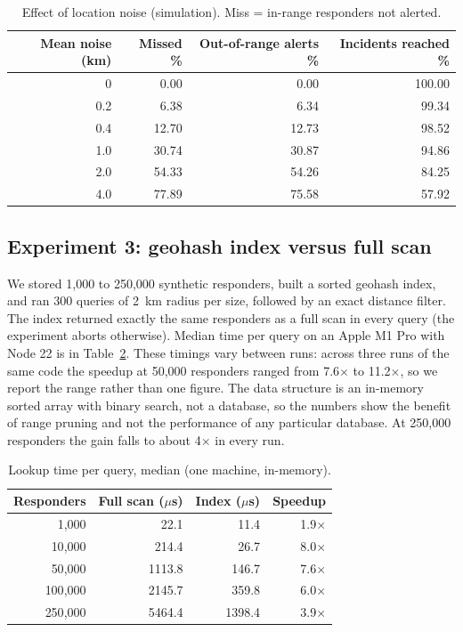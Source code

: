 \documentclass[conference]{IEEEtran}
\begin{document}
\begin{table}[t]
\caption{Effect of location noise (simulation). Miss = in-range responders not alerted.}
\label{tab:e2}
\centering
\small
\begin{tabular}{@{}rrrr@{}}
\toprule
Mean noise (km) & Missed \% & Out-of-range alerts \% & Incidents reached \% \\
\midrule
0 & 0.00 & 0.00 & 100.00 \\
0.2 & 6.38 & 6.34 & 99.34 \\
0.4 & 12.70 & 12.73 & 98.52 \\
1.0 & 30.74 & 30.87 & 94.86 \\
2.0 & 54.33 & 54.26 & 84.25 \\
4.0 & 77.89 & 75.58 & 57.92 \\
\bottomrule
\end{tabular}
\end{table}

\subsection{Experiment 3: geohash index versus full scan}
We stored 1{,}000 to 250{,}000 synthetic responders, built a sorted geohash index, and ran 300 queries of 2~km radius per size, followed by an exact distance filter. The index returned exactly the same responders as a full scan in every query (the experiment aborts otherwise). Median time per query on an Apple M1 Pro with Node 22 is in Table~\ref{tab:e3}. These timings vary between runs: across three runs of the same code the speedup at 50{,}000 responders ranged from 7.6$\times$ to 11.2$\times$, so we report the range rather than one figure. The data structure is an in-memory sorted array with binary search, not a database, so the numbers show the benefit of range pruning and not the performance of any particular database. At 250{,}000 responders the gain falls to about 4$\times$ in every run.

\begin{table}[t]
\caption{Lookup time per query, median (one machine, in-memory).}
\label{tab:e3}
\centering
\small
\begin{tabular}{@{}rrrr@{}}
\toprule
Responders & Full scan ($\mu$s) & Index ($\mu$s) & Speedup \\
\midrule
1{,}000 & 22.1 & 11.4 & 1.9$\times$ \\
10{,}000 & 214.4 & 26.7 & 8.0$\times$ \\
50{,}000 & 1113.8 & 146.7 & 7.6$\times$ \\
100{,}000 & 2145.7 & 359.8 & 6.0$\times$ \\
250{,}000 & 5464.4 & 1398.4 & 3.9$\times$ \\
\bottomrule
\end{tabular}
\end{table}
\end{document}
